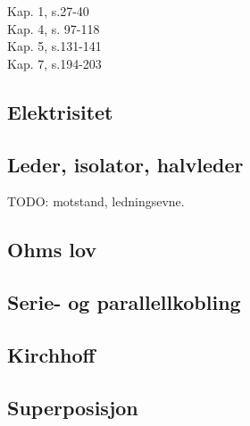 Kap. 1, s.27-40 \\
Kap. 4, s. 97-118 \\
Kap. 5, s.131-141 \\
Kap. 7, s.194-203

\subsection{Elektrisitet}




\subsection{Leder, isolator, halvleder}
TODO: motstand, ledningsevne.

\subsection{Ohms lov}


\subsection{Serie- og parallellkobling}


\subsection{Kirchhoff}


\subsection{Superposisjon}


